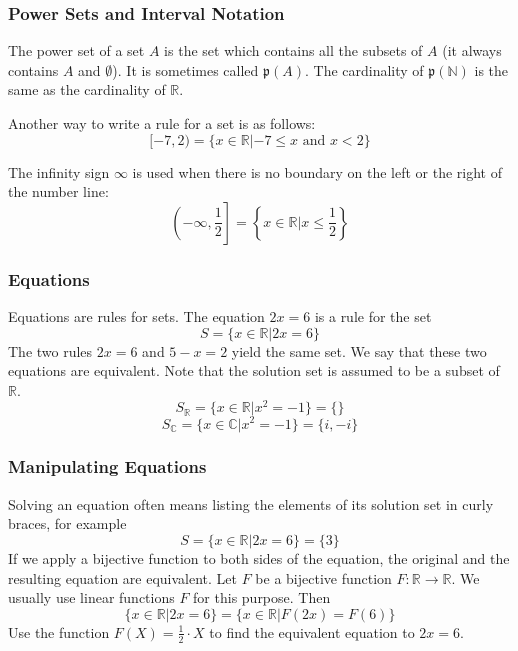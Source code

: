 \documentclass[xcolor=dvipsnames]{beamer}
\begin{document}
\begin{frame}
  \frametitle{Power Sets and Interval Notation}
  The \alert{power set} of a set $A$ is the set which contains all the
  subsets of $A$ (it always contains $A$ and $\emptyset$). It is
  sometimes called $\mathfrak{p}(A)$. The cardinality of
  $\mathfrak{p}(\mathbb{N})$ is the same as the cardinality of
  $\mathbb{R}$.

  Another way to write a rule for a set is as follows:
  \begin{equation}
    \label{eq:oosaeshu}
    [-7,2)=\{x\in\mathbb{R}|-7\leq{}x\mbox{ and }x<2\}
  \end{equation}

  The infinity sign $\infty$ is used when there is no boundary on the
  left or the right of the number line:
  \begin{equation}
    \label{eq:susheipe}
    \left.\left(-\infty,\frac{1}{2}\right.\right]=\left\{x\in\mathbb{R}|x\leq\frac{1}{2}\right\}
  \end{equation}
\end{frame}

\begin{frame}
  \frametitle{Equations}
  Equations are rules for sets. The equation $2x=6$ is a rule for the set
  \begin{equation}
    \label{eq:vaechohd}
    S=\{x\in\mathbb{R}|2x=6\}
  \end{equation}
  The two rules $2x=6$ and $5-x=2$ yield the same set. We say that
  these two equations are \alert{equivalent}. Note that the solution
  set is assumed to be a subset of $\mathbb{R}$.
  \begin{equation}
    \label{eq:xeedoogh}
    S_{\mathbb{R}}=\{x\in\mathbb{R}|x^{2}=-1\}=\{\}
  \end{equation}
  \begin{equation}
    \label{eq:aidietha}
    S_{\mathbb{C}}=\{x\in\mathbb{C}|x^{2}=-1\}=\{i,-i\}
  \end{equation}
\end{frame}

\begin{frame}
  \frametitle{Manipulating Equations}
  Solving an equation often means listing the elements of its
  \alert{solution set} in curly
  braces, for example
  \begin{equation}
    \label{eq:ohnomoow}
    S=\{x\in\mathbb{R}|2x=6\}=\{3\}
  \end{equation}
If we apply a bijective function to both sides of the equation, the
original and the resulting equation are equivalent. Let $F$ be a
bijective function $F:\mathbb{R}\rightarrow\mathbb{R}$. We usually use
linear functions $F$ for this purpose. Then
\begin{equation}
  \label{eq:iikucire}
  \{x\in\mathbb{R}|2x=6\}=\{x\in\mathbb{R}|F(2x)=F(6)\}
\end{equation}
{\ubung} Use the function $F(X)=\frac{1}{2}\cdot{}X$ to find the equivalent
equation to $2x=6$.
\end{frame}
\end{document}
